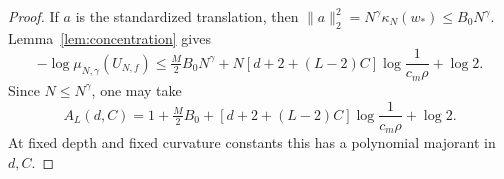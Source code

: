 \begin{proof}
If $a$ is the standardized translation, then
$\|a\|_2^2=N^\gamma\kappa_N(w_*)\leq B_0N^\gamma$.
Lemma~\ref{lem:concentration} gives
\[
 -\log\mu_{N,\gamma}(U_{N,f})
 \leq\tfrac M2B_0N^\gamma
 +N[d+2+(L-2)C]\log\frac1{c_m\rho}+\log2.
\]
Since $N\leq N^\gamma$, one may take
\begin{equation}\label{eq:Aexplicit}
 A_L(d,C)=1+\tfrac M2B_0+
 [d+2+(L-2)C]\log\frac1{c_m\rho}+\log2.
\end{equation}
At fixed depth and fixed curvature constants this has a polynomial
majorant in $d,C$.
\end{proof}
